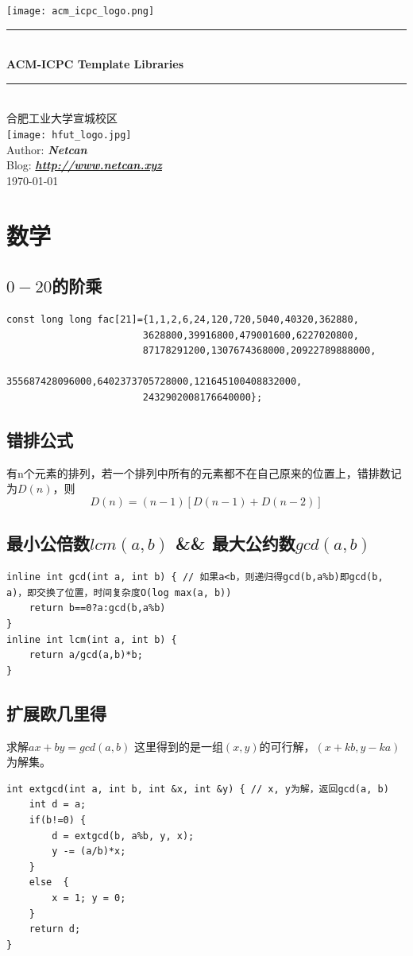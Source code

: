 \documentclass[a4paper]{ctexrep}
\newcommand{\HRule}{\rule{\linewidth}{0.5mm}} %
\begin{document}
\begin{titlepage}
\begin{center}
\texttt{[image: acm\_icpc\_logo.png]}\\[0.5cm]
\HRule\\[0.4cm]
{\huge \bfseries ACM-ICPC Template Libraries}\\[0.2cm]
\HRule\\[1.5cm]
\textsc{\large 合肥工业大学宣城校区}\\[1cm]
\texttt{[image: hfut\_logo.jpg]}\\[0.5cm]
Author: \textbf{\emph{Netcan}}\\
Blog: \textbf{\emph{\url{http://www.netcan.xyz}}}\\
{\large \today}\\[2cm]
\end{center}
\end{titlepage}

\tableofcontents

\chapter{数学}
\section{$0-20$的阶乘}
\begin{lstlisting}
const long long fac[21]={1,1,2,6,24,120,720,5040,40320,362880,
						3628800,39916800,479001600,6227020800,
						87178291200,1307674368000,20922789888000,
						355687428096000,6402373705728000,121645100408832000,
						2432902008176640000};
\end{lstlisting}
\section{错排公式}
有n个元素的排列，若一个排列中所有的元素都不在自己原来的位置上，错排数记为$D(n)$，则
$$D(n) = (n-1)[D(n-1)+D(n-2)]$$
\section{最小公倍数$lcm(a,b)$ \&\& 最大公约数$gcd(a,b)$}
\begin{lstlisting}
inline int gcd(int a, int b) { // 如果a<b，则递归得gcd(b,a%b)即gcd(b, a)，即交换了位置，时间复杂度O(log max(a, b))
	return b==0?a:gcd(b,a%b)
}
inline int lcm(int a, int b) {
	return a/gcd(a,b)*b;
}
\end{lstlisting}
\section{扩展欧几里得}
求解$a x + b y = gcd(a, b)$
这里得到的是一组$(x, y)$的可行解，$(x+k b, y-k a)$为解集。
\begin{lstlisting}
int extgcd(int a, int b, int &x, int &y) { // x, y为解，返回gcd(a, b)
	int d = a;
	if(b!=0) {
		d = extgcd(b, a%b, y, x);
		y -= (a/b)*x;
	}
	else  {
		x = 1; y = 0;
	}
	return d;
}
\end{lstlisting}
\end{document}
